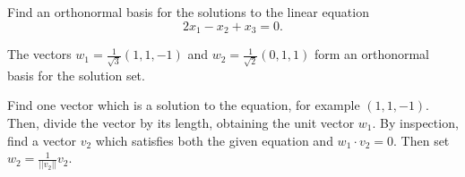 \documentclass{ximera}
\begin{document}
\begin{exercise} \label{c7.4.1}
Find an orthonormal basis for the solutions to the linear equation
\[
2x_1-x_2+x_3=0.
\]

\begin{solution}

\ans The vectors $w_1 = \frac{1}{\sqrt{3}}(1,1,-1)$ and
$w_2 = \frac{1}{\sqrt{2}}(0,1,1)$ form an orthonormal basis
for the solution set.

\soln Find one vector which is a solution to the equation, for
example $(1,1,-1)$.  Then, divide the vector by its length, obtaining
the unit vector $w_1$.  By inspection, find a vector $v_2$ which
satisfies both the given equation and $w_1 \cdot v_2 = 0$.  Then set
$w_2 = \frac{1}{||v_2||}v_2$.

\end{solution}
\end{exercise}
\end{document}
